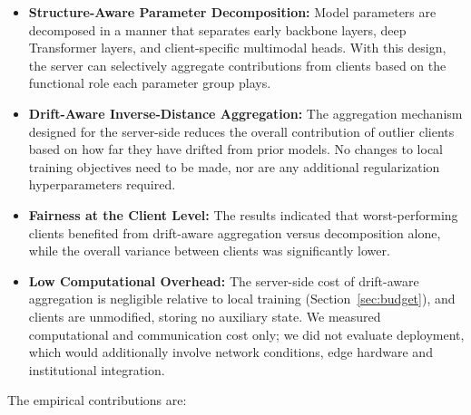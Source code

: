 \documentclass{ieeeaccess}
\begin{document}
\begin{itemize}
    \item \textbf{Structure-Aware Parameter Decomposition:} Model parameters are decomposed in a manner that separates early backbone layers, deep Transformer layers, and client-specific multimodal heads. With this design, the server can selectively aggregate contributions from clients based on the functional role each parameter group plays.

    \item \textbf{Drift-Aware Inverse-Distance Aggregation:} The aggregation mechanism designed for the server-side reduces the overall contribution of outlier clients based on how far they have drifted from prior models. No changes to local training objectives need to be made, nor are any additional regularization hyperparameters required.




    \item \textbf{Fairness at the Client Level:} The results indicated that worst-performing clients benefited from drift-aware aggregation versus decomposition alone, while the overall variance between clients was significantly lower.

    \item \textbf{Low Computational Overhead:} The server-side cost of drift-aware aggregation is negligible relative to local training (Section~\ref{sec:budget}), and clients are unmodified, storing no auxiliary state. We measured computational and communication cost only; we did not evaluate deployment, which would additionally involve network conditions, edge hardware and institutional integration.

\end{itemize}

The empirical contributions are:
\end{document}
